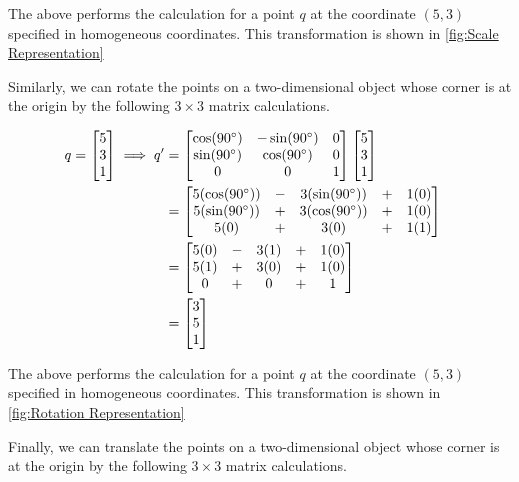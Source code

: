 \documentclass[
    12pt,
    twoside,
    bibstyle=chicago,
    headerstyle=uppercase,
	bibfile=biblatex_updating.bib
]{reedthesis}
\begin{document}
The above performs the calculation for a point $q$ at the coordinate $(5,3)$ specified in homogeneous coordinates. This transformation is shown in \ref{fig:Scale Representation}

Similarly, we can rotate the points on a two-dimensional object whose corner is at the origin by the following $3\times3$ matrix calculations.

\begin{align*}	
	q = \begin{bmatrix}5\\3\\1\end{bmatrix} \implies q' &= 
	\begin{bmatrix}\cos(90\degree)&-\sin(90\degree)&0\\\sin(90\degree)&\cos(90\degree)&0\\0&0&1\end{bmatrix}
	\begin{bmatrix}5\\3\\1\end{bmatrix}\\ &= 
	\begin{bmatrix}5(\cos(90\degree)) &-& 3(\sin(90\degree)) &+& 1(0)\\5(\sin(90\degree)) &+& 3(\cos(90\degree)) &+& 1(0)\\5(0) &+& 3(0) &+& 1(1)\end{bmatrix}&\\ &=
	\begin{bmatrix}5(0) &-& 3(1) &+& 1(0)\\5(1) &+& 3(0) &+& 1(0)\\0 &+& 0 &+& 1\end{bmatrix}\\ &= \begin{bmatrix}3\\5\\1\end{bmatrix}
	\end{align*}
	

The above performs the calculation for a point $q$ at the coordinate $(5,3)$ specified in homogeneous coordinates. This transformation is shown in \ref{fig:Rotation Representation}

Finally, we can translate the points on a two-dimensional object whose corner is at the origin by the following $3\times3$ matrix calculations.
\end{document}
